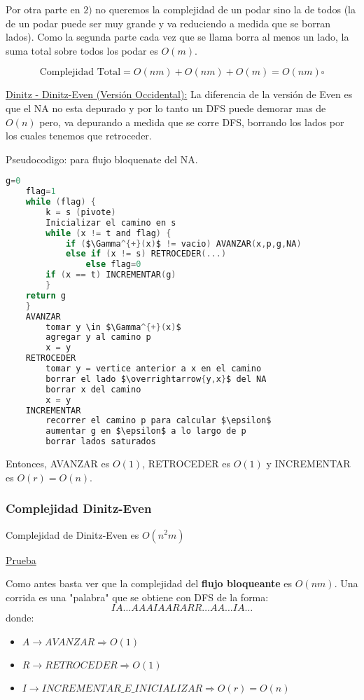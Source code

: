 \documentclass[12pt,a4paper]{article}
\begin{document}
Por otra parte en $2)$ no queremos la complejidad de un podar sino la de todos 
(la de un podar puede ser muy grande y va reduciendo a medida que se borran lados).
Como la segunda parte cada vez que se llama borra al menos un lado, la suma total 
sobre todos los podar es $O(m)$.

$$\text{Complejidad Total} = O(nm) + O(nm) + O(m) = O(nm) \square$$

\underline{Dinitz - Dinitz-Even (Versión Occidental):} La diferencia de la versión 
de Even es que el NA no esta depurado y por lo tanto un DFS puede demorar mas de 
$O(n)$ pero, va depurando a medida que se corre DFS, borrando los lados por los 
cuales tenemos que retroceder.
\medskip

Pseudocodigo: para flujo bloquenate del NA.
\begin{lstlisting}[language=C]
    g=0
    flag=1
    while (flag) {
        k = s (pivote)
        Inicializar el camino en s
        while (x != t and flag) {
            if ($\Gamma^{+}(x)$ != vacio) AVANZAR(x,p,g,NA)
            else if (x != s) RETROCEDER(...)
                else flag=0
        if (x == t) INCREMENTAR(g)
        }
    return g
    }
    AVANZAR
        tomar y \in $\Gamma^{+}(x)$
        agregar y al camino p
        x = y
    RETROCEDER
        tomar y = vertice anterior a x en el camino
        borrar el lado $\overrightarrow{y,x}$ del NA
        borrar x del camino
        x = y 
    INCREMENTAR
        recorrer el camino p para calcular $\epsilon$
        aumentar g en $\epsilon$ a lo largo de p
        borrar lados saturados
\end{lstlisting}

Entonces, AVANZAR es $O(1)$, RETROCEDER es $O(1)$ y INCREMENTAR es $O(r)=O(n)$.

\subsubsection{Complejidad Dinitz-Even}
\begin{teorema} Complejidad de Dinitz-Even es $O(n^{2}m)$
\end{teorema}

\underline{Prueba}
\medskip

Como antes basta ver que la complejidad del \textbf{flujo bloqueante} es $O(nm)$. 
Una corrida es una "palabra" que se obtiene con DFS de la forma:
$$IA\ldots AAAIAARARR \ldots AA \ldots IA\ldots$$ 
donde:
\begin{itemize}
    \item $A \to AVANZAR \Rightarrow O(1)$
    \item $R \to RETROCEDER \Rightarrow O(1)$
    \item $I \to INCREMENTAR\_E\_INICIALIZAR \Rightarrow O(r) = O(n)$
\end{itemize}
\end{document}

